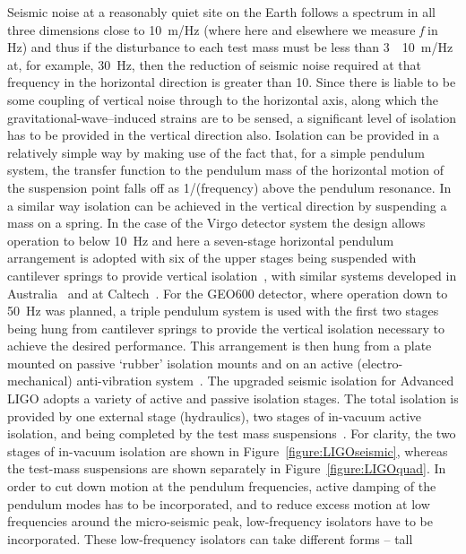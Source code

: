 Seismic noise at a reasonably quiet site on the Earth follows a
spectrum in all three dimensions close to 10~m/Hz (where here and elsewhere we measure
\textit{f} in Hz) and thus if the disturbance to each test mass must
be less than 3~\texttimes~10~m/Hz at, for
example, 30~Hz, then the reduction of seismic noise required at that
frequency in the horizontal direction is greater than
10. Since there is liable to be some coupling of vertical
noise through to the horizontal axis, along which the gravitational-wave--induced strains are to be sensed, a significant level of
isolation has to be provided in the vertical direction also. Isolation
can be provided in a relatively simple way by making use of the fact
that, for a simple pendulum system, the transfer function to the
pendulum mass of the horizontal motion of the suspension point falls
off as 1/(frequency) above the pendulum resonance. In a
similar way isolation can be achieved in the vertical direction by
suspending a mass on a spring. In the case of the Virgo detector
system the design allows operation to below 10~Hz and here a
seven-stage horizontal pendulum arrangement is adopted with six of the
upper stages being suspended with cantilever springs to provide vertical
isolation~\cite{Braccini}, with similar systems developed in
Australia~\cite{Ju1} and at Caltech~\cite{DeSalvo}. For the GEO600
detector, where operation down to 50~Hz was planned, a triple pendulum
system is used with the first two stages being hung from cantilever
springs to provide the vertical isolation necessary to achieve the
desired performance. This arrangement is then hung from a plate
mounted on passive `rubber' isolation mounts and on an active
(electro-mechanical) anti-vibration system~\cite{Plissi1, Torrie}. The
upgraded seismic isolation for Advanced LIGO adopts a
variety of active and passive isolation stages. The total isolation
is provided by one external stage (hydraulics), two stages of
in-vacuum active isolation, and being completed by the test mass
suspensions~\cite{Abbott:2002, Harry:2010}. For clarity, the two
stages of in-vacuum isolation are shown in
Figure~\ref{figure:LIGOseismic}, whereas the test-mass suspensions are
shown separately in Figure~\ref{figure:LIGOquad}. In order to cut down motion at the pendulum frequencies, active damping of the
pendulum modes has to be incorporated, and to reduce excess motion at low
frequencies around the micro-seismic peak, low-frequency isolators have to be
incorporated. These low-frequency isolators can take different forms -- tall

